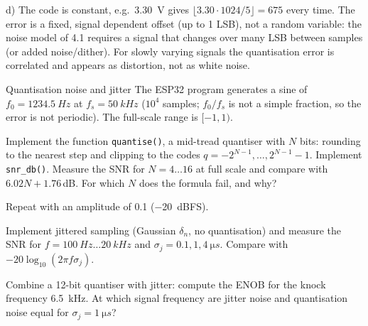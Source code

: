 \begin{solution}
d) The code is constant, e.g.\ \SI{3.30}{V} gives
$\lfloor 3.30\cdot1024/5\rfloor=675$ every time. The error is a fixed, signal
dependent offset (up to 1 LSB), not a random variable: the noise model of
4.1 requires a signal that changes over many LSB between samples (or added
noise/dither). For slowly varying signals the quantisation error is
correlated and appears as distortion, not as white noise.
\end{solution}

\begin{exercise}{Quantisation noise and jitter}{\Wokwi}
The ESP32 program  generates a sine of
$f_0=\SI{1234.5}{Hz}$ at $f_s=\SI{50}{kHz}$ ($10^4$ samples; $f_0/f_s$ is not
a simple fraction, so the error is not periodic). The full-scale range is
$[-1,1)$.
\begin{tasks}
  \item Implement the function \texttt{quantise()}, a mid-tread quantiser
    with $N$ bits: rounding to the nearest step and clipping to the codes
    $q=-2^{N-1},\dots,2^{N-1}-1$. Implement \texttt{snr\_db()}. Measure the SNR for $N=4\dots16$ at full scale and
    compare with $6.02N+1.76$\,dB. For which $N$ does the formula fail, and
    why?
  \item Repeat with an amplitude of 0.1 (\SI{-20}{dBFS}).
  \item Implement jittered sampling (Gaussian $\delta_n$, no quantisation)
    and measure the SNR for $f=\SI{100}{Hz}\dots\SI{20}{kHz}$ and
    $\sigma_j=0.1,1,\SI{4}{\micro s}$. Compare with
    $-20\log_{10}(2\pi f\sigma_j)$.
  \item Combine a 12-bit quantiser with jitter: compute the ENOB for the
    knock frequency \SI{6.5}{kHz}. At which signal frequency are jitter
    noise and quantisation noise equal for $\sigma_j=\SI{1}{\micro s}$?
\end{tasks}
\end{exercise}

